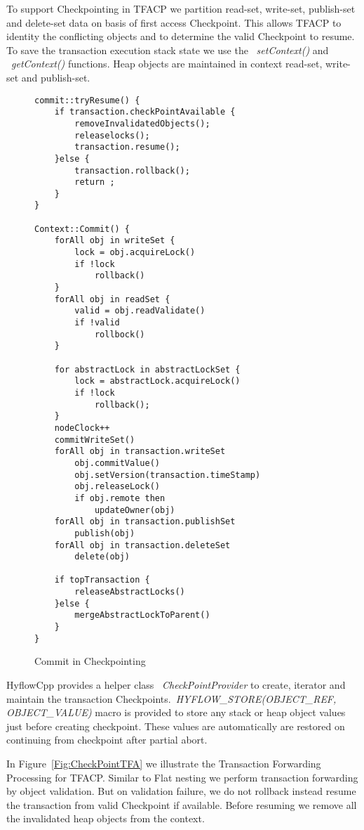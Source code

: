 \documentclass[12pt,english]{report}
\begin{document}
To support Checkpointing in TFACP we partition read-set, write-set, publish-set and delete-set data on basis of first access Checkpoint. This allows TFACP to identity the conflicting objects and to determine the valid Checkpoint to resume. To save the transaction execution stack state we use the ~\emph{setContext()} and ~\emph{getContext()} functions. Heap objects are maintained in context read-set, write-set and publish-set. 

\begin{figure}
\begin{minipage}[b]{0.9\linewidth}\centering
\begin{lstlisting}
commit::tryResume() {
	if transaction.checkPointAvailable {
		removeInvalidatedObjects();
		releaselocks();
		transaction.resume();
	}else {
		transaction.rollback();
		return ;
	}		
}

Context::Commit() {
	forAll obj in writeSet {
		lock = obj.acquireLock()
		if !lock
			rollback()
	}
	forAll obj in readSet {
		valid = obj.readValidate()
		if !valid
			rollbock()
	}
	
	for abstractLock in abstractLockSet {
		lock = abstractLock.acquireLock()
		if !lock
			rollback();
	}
	nodeClock++
	commitWriteSet()
	forAll obj in transaction.writeSet
		obj.commitValue()
 		obj.setVersion(transaction.timeStamp)
 		obj.releaseLock()
 		if obj.remote then
 			updateOwner(obj)
	forAll obj in transaction.publishSet
		publish(obj)
	forAll obj in transaction.deleteSet
		delete(obj)
		
	if topTransaction {
		releaseAbstractLocks()
	}else {
		mergeAbstractLockToParent()
	}	
}
\end{lstlisting}
\end{minipage}
\caption{Commit in Checkpointing}
\label{Fig:CheckpointCommit}
\end{figure}

HyflowCpp provides a helper class ~\emph{CheckPointProvider} to create, iterator and maintain the transaction Checkpoints.~\emph{HYFLOW{\_}STORE(OBJECT{\_}REF, OBJECT{\_}VALUE)} macro is provided to store any stack or heap object values just before creating checkpoint. These values are automatically are restored on continuing from checkpoint after partial abort.     

In Figure~\ref{Fig:CheckPointTFA} we illustrate the Transaction Forwarding Processing for TFACP. Similar to Flat nesting we perform transaction forwarding by object validation. But on validation failure, we do not rollback instead resume the transaction from valid Checkpoint if available. Before resuming we remove all the invalidated heap objects from the context.
\end{document}
